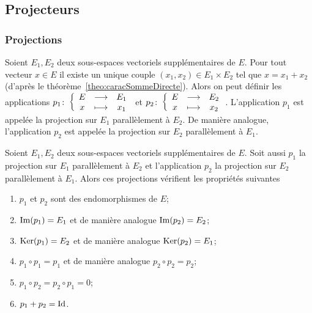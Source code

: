 \subsection{Projecteurs}

\subsubsection{Projections}
\label{sec:projections}

\begin{defdef}
  Soient \(E_1, E_2\) deux sous-espaces vectoriels supplémentaires de \(E\).
  Pour tout vecteur \(x \in E\) il existe un unique couple \((x_1,x_2) \in E_1
  \times E_2\) tel que \(x=x_1+x_2\) (d'après le théorème~\ref{theo:caracSommeDirecte}). Alors on peut définir les applications
  \(p_1\colon\left\{\begin{array}{ccc}E & \longrightarrow &E_1\\x & \longmapsto & x_1\end{array}\right.\) et \(p_2\colon\left\{\begin{array}{ccc}E & \longrightarrow &E_2\\x & \longmapsto & x_2\end{array}\right.\).
  L'application \(p_1\) est appelée la projection sur \(E_1\) parallèlement à
  \(E_2\). De manière analogue, l'application \(p_2\) est appelée la projection
  sur \(E_2\) parallèlement à \(E_1\).
\end{defdef}

\begin{theo}\label{theo:propprojection}
  Soient \(E_1, E_2\) deux sous-espaces vectoriels supplémentaires de \(E\).
  Soit aussi \(p_1\) la projection sur \(E_1\) parallèlement à \(E_2\) et
  l'application \(p_2\) la projection sur \(E_2\) parallèlement à \(E_1\). Alors
  ces projections vérifient les propriétés suivantes
  \begin{enumerate}
    \item \(p_1\) et \(p_2\) sont des endomorphismes de \(E\);
    \item \(\operatorname{Im}(p_1)=E_1\) et de manière analogue \(\operatorname{Im}(p_2)=E_2\);
    \item \(\operatorname{Ker}(p_1)=E_2\) et de manière analogue \(\operatorname{Ker}(p_2)=E_1\);
    \item \(p_1 \circ p_1=p_1\) et de manière analogue \(p_2 \circ p_2=p_2\);
    \item \(p_1 \circ p_2 = p_2 \circ p_1=0\);
    \item \(p_1+p_2=\operatorname{Id}\).
  \end{enumerate}
\end{theo}

